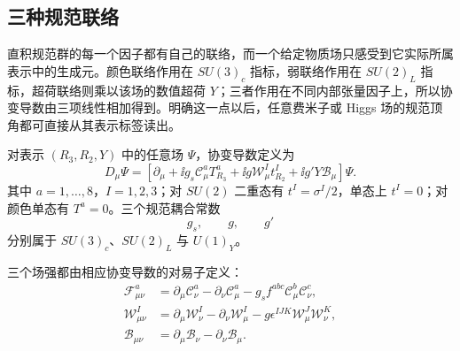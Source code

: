 \subsection{三种规范联络}

直积规范群的每一个因子都有自己的联络，而一个给定物质场只感受到它实际所属表示中的生成元。颜色联络作用在 $SU(3)_c$ 指标，弱联络作用在 $SU(2)_L$ 指标，超荷联络则乘以该场的数值超荷 $Y$；三者作用在不同内部张量因子上，所以协变导数由三项线性相加得到。明确这一点以后，任意费米子或 Higgs 场的规范顶角都可直接从其表示标签读出。

对表示 $(R_3,R_2,Y)$ 中的任意场 $\Psi$，协变导数定义为
\begin{equation}
 \boxed{
 D_\mu\Psi
 =\left[
 \partial_\mu
 +\ii g_s\mathscr C_\mu^aT_{R_3}^a
 +\ii g\mathcal W_\mu^I t_{R_2}^I
 +\ii g'Y\mathcal B_\mu
 \right]\Psi.}
 \label{eq:sm-covariant-derivative-dp11}
\end{equation}
其中 $a=1,\ldots,8$，$I=1,2,3$；对 $SU(2)$ 二重态有 $t^I=\sigma^I/2$，单态上 $t^I=0$；对颜色单态有 $T^a=0$。三个规范耦合常数
\begin{equation*}
 g_s,\qquad g,\qquad g'
\end{equation*}
分别属于 $SU(3)_c$、$SU(2)_L$ 与 $U(1)_Y$。


三个场强都由相应协变导数的对易子定义：
\begin{align}
 \mathcal F_{\mu\nu}^a
 &=\partial_\mu\mathscr C_\nu^a-\partial_\nu\mathscr C_\mu^a
 -g_sf^{abc}\mathscr C_\mu^b\mathscr C_\nu^c,\\
 \mathcal W_{\mu\nu}^I
 &=\partial_\mu\mathcal W_\nu^I-\partial_\nu\mathcal W_\mu^I
 -g\epsilon^{IJK}\mathcal W_\mu^J\mathcal W_\nu^K,\\
 \mathcal B_{\mu\nu}
 &=\partial_\mu\mathcal B_\nu-\partial_\nu\mathcal B_\mu.
 \label{eq:sm-field-strengths-dp11}
\end{align}

